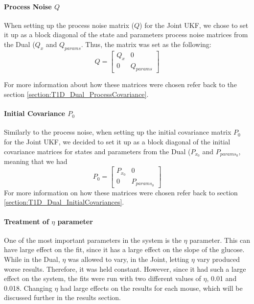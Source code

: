 \paragraph{Process Noise $Q$}
When setting up the process noise matrix ($Q$) for the Joint UKF, we chose to set it up as a block diagonal of the state and parameters process noise matrices from the Dual ($Q_x$ and $Q_{params}$. Thus, the matrix was set as the following:\\
\begin{equation}
Q = \begin{bmatrix} Q_x & 0 \\ 0 & Q_{params} \end{bmatrix}
\end{equation}

For more information about how these matrices were chosen refer back to the section \ref{section:T1D_Dual_ProcessCovariance}.

\paragraph{Initial Covariance $P_0$}
Similarly to the process noise, when setting up the initial covariance matrix $P_0$ for the Joint UKF, we decided to set it up as a block diagonal of the initial covariance matrices for states and parameters from the Dual ($P_{x_0}$ and $P_{params_0}$, meaning that we had\\
\begin{equation}
P_0 = \begin{bmatrix} P_{x_0} & 0 \\ 0 & P_{params_0} \end{bmatrix}
\end{equation}
For more information on how these matrices were chosen refer back to section \ref{section:T1D_Dual_InitialCovariances}. 

\paragraph{Treatment of $\eta$ parameter}
One of the most important parameters in the system is the $\eta$ parameter. This can have large effect on the fit, since it has a large effect on the slope of the glucose. While in the Dual, $\eta$ was allowed to vary, in the Joint, letting $\eta$ vary produced worse results. Therefore, it was held constant. However, since it had such a large effect on the system, the fits were run with two different values of $\eta$, 0.01 and 0.018. Changing $\eta$ had large effects on the results for each mouse, which will be discussed further in the results section. 

